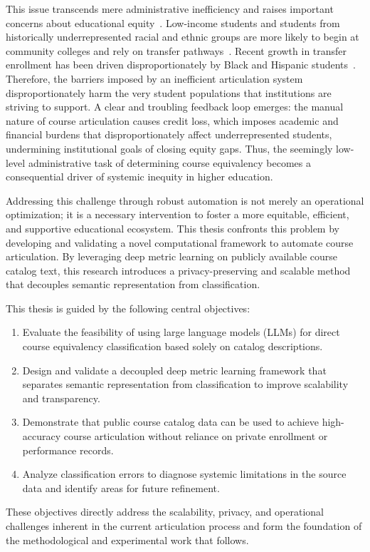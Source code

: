 This issue transcends mere administrative inefficiency and raises important concerns about educational equity~\cite{collegeopportunity2017}. Low-income students and students from historically underrepresented racial and ethnic groups are more likely to begin at community colleges and rely on transfer pathways~\cite{ace2025}. Recent growth in transfer enrollment has been driven disproportionately by Black and Hispanic students~\cite{nscnews2023}. Therefore, the barriers imposed by an inefficient articulation system disproportionately harm the very student populations that institutions are striving to support. A clear and troubling feedback loop emerges: the manual nature of course articulation causes credit loss, which imposes academic and financial burdens that disproportionately affect underrepresented students, undermining institutional goals of closing equity gaps. Thus, the seemingly low-level administrative task of determining course equivalency becomes a consequential driver of systemic inequity in higher education.

Addressing this challenge through robust automation is not merely an operational optimization; it is a necessary intervention to foster a more equitable, efficient, and supportive educational ecosystem. This thesis confronts this problem by developing and validating a novel computational framework to automate course articulation. By leveraging deep metric learning on publicly available course catalog text, this research introduces a privacy-preserving and scalable method that decouples semantic representation from classification.


This thesis is guided by the following central objectives:
\begin{enumerate}
\item Evaluate the feasibility of using large language models (LLMs) for direct course equivalency classification based solely on catalog descriptions.
\item Design and validate a decoupled deep metric learning framework that separates semantic representation from classification to improve scalability and transparency.
\item Demonstrate that public course catalog data can be used to achieve high-accuracy course articulation without reliance on private enrollment or performance records.
\item Analyze classification errors to diagnose systemic limitations in the source data and identify areas for future refinement.
\end{enumerate}
These objectives directly address the scalability, privacy, and operational challenges inherent in the current articulation process and form the foundation of the methodological and experimental work that follows.

